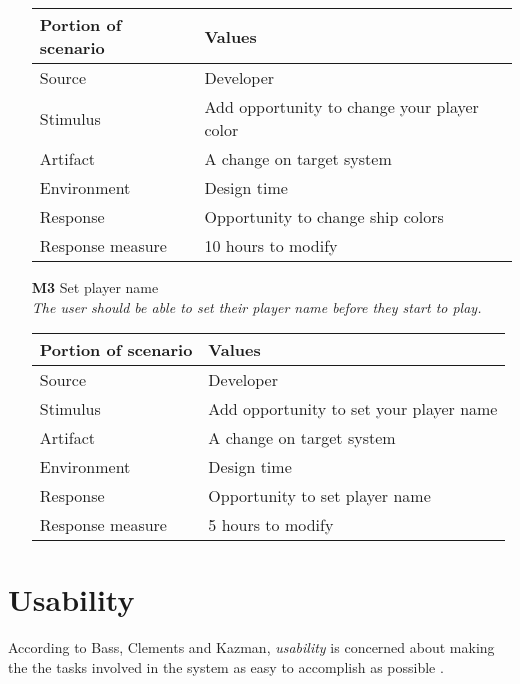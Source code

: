 \begin{itemize}
        \begin{tabular}{| l | l |}
            \hline
            \rowcolor[gray]{0.8}
            \textbf{Portion of scenario} & \textbf{Values} \\
            \hline
            Source & Developer \\
            Stimulus & Add opportunity to change your player color \\
            Artifact & A change on target system \\
            Environment & Design time \\
            Response & Opportunity to change ship colors  \\
            Response measure & 10 hours to modify \\
            \hline
        \end{tabular}
    
        \item[\textbf{M3}] Set player name \\
        \textit{\small{The user should be able to set their player name before they start to play.}}
        
        \begin{tabular}{| l | l |}
            \hline
            \rowcolor[gray]{0.8}
            \textbf{Portion of scenario} & \textbf{Values} \\
            \hline
            Source & Developer \\
            Stimulus & Add opportunity to set your player name \\
            Artifact & A change on target system \\
            Environment & Design time \\
            Response & Opportunity to set player name  \\
            Response measure & 5 hours to modify \\
            \hline
        \end{tabular}
    \end{itemize}



\section{Usability}
According to Bass, Clements and Kazman, \emph{usability} is concerned about making the the tasks involved in the system as easy to accomplish as possible \cite{pensum}.

